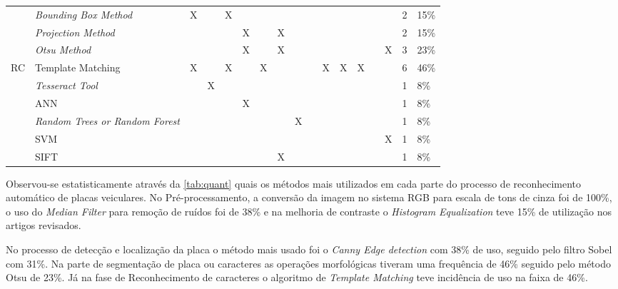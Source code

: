 \begin{table}[htb]
\begin{tabular}{p{1.7cm}|p{2.7cm}|p{2cm}|p{.1cm}|p{.1cm}|p{.1cm}|p{.1cm}|p{.1cm}|p{.1cm}|p{.1cm}|p{.1cm}|p{.1cm}|p{.1cm}|p{.1cm}|p{.1cm}|p{.1cm}|p{.7cm}|p{.4cm}}
		\cline{2-18}
		& \multicolumn{2}{p{4.7cm}|}{\textit{Bounding Box Method}} & X &  & X &  &  &  &  &  &  &  &  &  &  & 2 & 15\% \\
		\cline{2-18}
		& \multicolumn{2}{p{4.7cm}|}{\textit{Projection Method}} &  &  &  & X &  & X &  &  &  &  &  &  &  & 2 & 15\% \\
		\cline{2-18}
		& \multicolumn{2}{p{4.7cm}|}{\textit{Otsu Method}} &  &  &  & X &  & X &  &  &  &  &  &  & X & 3 & 23\% \\
		\hline
		\multirow{6}{*}{RC} & \multicolumn{2}{p{4.7cm}|}{Template Matching} & X &  & X &  & X &  &  &  & X & X & X &  &  & 6 & 46\% \\
		\cline{2-18}
		& \multicolumn{2}{p{4.7cm}|}{\textit{Tesseract Tool}} &  & X &  &  &  &  &  &  &  &  &  &  &  & 1 & 8\% \\
		\cline{2-18}
		& \multicolumn{2}{p{4.7cm}|}{ANN} &  &  &  & X &  &  &  &  &  &  &  &  &  & 1 & 8\% \\
		\cline{2-18}
		& \multicolumn{2}{p{4.7cm}|}{\textit{Random Trees or Random Forest}} &  &  &  &  &  &  & X &  &  &  &  &  &  & 1 & 8\% \\
		\cline{2-18}
		& \multicolumn{2}{p{4.7cm}|}{SVM} &  &  &  &  &  &  &  &  &  &  &  &  & X & 1 & 8\% \\
		\cline{2-18}
		& \multicolumn{2}{p{4.7cm}|}{SIFT} &  &  &  &  &  & X &  &  &  &  &  &  &  & 1 & 8\% \\
		\hline \hline
	\end{tabular}
\end{table} 

Observou-se estatisticamente através da \autoref{tab:quant} quais os métodos mais utilizados em cada parte do processo de reconhecimento automático de placas veiculares. No Pré-processamento, a conversão da imagem no sistema RGB para escala de tons de cinza foi de 100\%, o uso do \textit{Median Filter} para remoção de ruídos foi de 38\% e na melhoria de contraste o \textit{Histogram Equalization} teve 15\% de utilização nos artigos revisados.

No processo de detecção e localização da placa o método mais usado foi o \textit{Canny Edge detection} com 38\% de uso, seguido pelo filtro Sobel com 31\%. Na parte de segmentação de placa ou caracteres as operações morfológicas tiveram uma frequência de 46\% seguido pelo método Otsu de 23\%. Já na fase de Reconhecimento de caracteres o algoritmo de \textit{Template Matching} teve incidência de uso na faixa de 46\%. 

